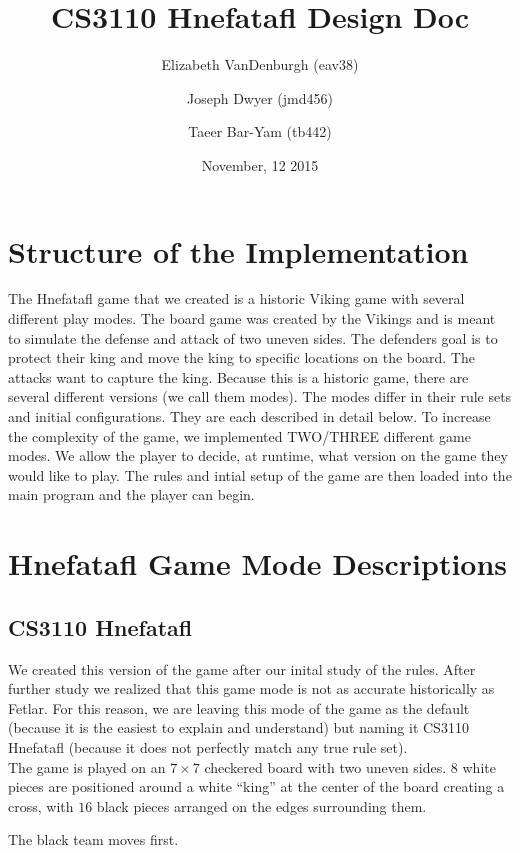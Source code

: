 \documentclass[11pt, oneside]{article}
\title{CS3110 Hnefatafl Design Doc}
\author{Elizabeth VanDenburgh (eav38)\and Joseph Dwyer (jmd456)\and Taeer Bar-Yam (tb442)}
\date{November, 12 2015}
\begin{document}
\maketitle

\section{Structure of the Implementation}
The Hnefatafl game that we created is a historic Viking game with several different play modes.
The board game was created by the Vikings and is meant to simulate the defense and attack
of two uneven sides.  The defenders goal is to protect their king and move the king to specific
locations on the board.  The attacks want to capture the king.  Because this is a historic
game, there are several different versions (we call them modes).
The modes differ in their rule sets and initial configurations.
They are each described in detail below. To increase the complexity of the game, we implemented
TWO/THREE different game modes.  We allow the player
to decide, at runtime, what version on the game they would like to play.  The rules
and intial setup of the game are then loaded into the main program and the player
can begin.

\section{Hnefatafl Game Mode Descriptions}
\subsection{CS3110 Hnefatafl}
We created this version of the game after our inital study of the rules.  After further study
we realized that this game mode is not as accurate historically as Fetlar.  For this reason, we
are leaving this mode of the game as the default (because it is the easiest to explain and understand)
but naming it CS3110 Hnefatafl (because it does not perfectly match any true rule set).\\
The game is played on an $7\times 7$ checkered board with two uneven sides.
$8$ white pieces are positioned around a white ``king'' at the center of the
board creating a cross, with $16$ black pieces arranged on the edges surrounding them.

The black team moves first.
\end{document}
